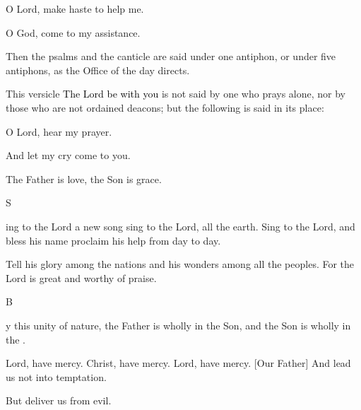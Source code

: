 \documentclass{breviary}
\begin{document}
\begin{brevbody}
\vers{} O Lord, make haste to help me.

\resp{} O God, come to my assistance.

\begin{rubricpar}
Then the psalms and the canticle are said under one antiphon, or under five antiphons, as the Office of the day directs.

\end{rubricpar}
\brevrule
\begin{rubricpar}
This versicle \textcolor{black}{The Lord be with you} is not said by one who prays alone, nor by those who are not ordained deacons; but the following is said in its place:

\end{rubricpar}
\vers{} O Lord, hear my prayer.

\resp{} And let my cry come to you.

%
The Father is love, the Son is grace.

\opening[black]{S}{ing} to the Lord a new song \med{} sing to the Lord, all the earth. Sing to the Lord, and bless his name \med{} proclaim his help from day to day.

Tell his glory among the nations \med{} and his wonders among all the peoples. For the Lord is great \med{} and worthy of praise.

\brevrule
{}
\opening[black]{B}{y} this unity of nature, the Father is wholly in the Son, and the Son is wholly in the \unclear{}.

Lord, have mercy. Christ, have mercy. Lord, have mercy. [Our Father]  And lead us not into temptation.

\resp{} But deliver us from evil.

\end{brevbody}
\end{document}
